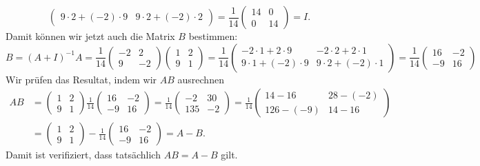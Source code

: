 \begin{loesung}
\[\begin{pmatrix}
 9\cdot 2 + (-2)\cdot 9 &  9 \cdot 2 +(-2) \cdot 2
\end{pmatrix}
=
\frac1{14}
\begin{pmatrix}
14& 0\\
 0&14
\end{pmatrix}
=I.
\]
Damit können wir jetzt auch die Matrix $B$ bestimmen:
\[
B=(A+I)^{-1}A
=
\frac1{14}
\begin{pmatrix}
-2& 2\\
 9&-2
\end{pmatrix}
\begin{pmatrix}
1&2\\
9&1
\end{pmatrix}
=
\frac1{14}
\begin{pmatrix}
-2 \cdot 1 +   2  \cdot 9 & -2 \cdot 2 +   2  \cdot 1 \\
 9 \cdot 1 + (-2) \cdot 9 &  9 \cdot 2 + (-2) \cdot 1
\end{pmatrix}
=
\frac1{14}
\begin{pmatrix}
16& -2\\
-9&16
\end{pmatrix}
\]
Wir prüfen das Resultat, indem wir $AB$ ausrechnen
\begin{align*}
AB&=
\begin{pmatrix}
1&2\\
9&1
\end{pmatrix}
\frac1{14}
\begin{pmatrix}
16& -2\\
-9& 16
\end{pmatrix}
=
\frac1{14}
\begin{pmatrix}
 -2&30\\
135&-2
\end{pmatrix}
=
\frac1{14}
\begin{pmatrix}
 14 -  16 &28 -(-2)\\
126 - (-9)&14 - 16
\end{pmatrix}
\\
&=
\begin{pmatrix}
 1 & 2\\
 9 & 1
\end{pmatrix}
-
\frac1{14}
\begin{pmatrix}
16& -2\\
-9& 16
\end{pmatrix}
=
A-B.
\end{align*}
Damit ist verifiziert, dass tatsächlich $AB=A-B$ gilt.
\end{loesung}

